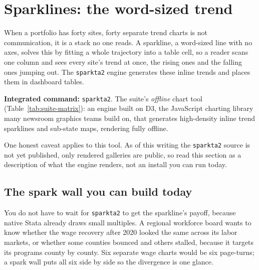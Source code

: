 \documentclass[
    a4paper,
    fontsize=10pt,
    twoside=true,
    numbers=noenddot,
]{kaobook}
\begin{document}
\section{Sparklines: the word-sized trend}
When a portfolio has forty sites, forty separate trend charts is not communication, it is a stack no one reads. A sparkline, a word-sized line with no axes, solves this by fitting a whole trajectory into a table cell, so a reader scans one column and sees every site's trend at once, the rising ones and the falling ones jumping out. The \texttt{sparkta2} engine generates these inline trends and places them in dashboard tables.

\begin{kaobox}[frametitle=Package Integration: \texttt{sparkta2}]
\textbf{Integrated command:} \texttt{sparkta2}. The suite's \emph{offline} chart tool (Table~\ref{tab:suite-matrix}): an engine built on D3, the JavaScript charting library many newsroom graphics teams build on, that generates high-density inline trend sparklines and sub-state maps, rendering fully offline.
\end{kaobox}

One honest caveat applies to this tool. As of this writing the \texttt{sparkta2} source is not yet published, only rendered galleries are public, so read this section as a description of what the engine renders, not an install you can run today.

\subsection{The spark wall you can build today}\label{sec:sparkwall}
You do not have to wait for \texttt{sparkta2} to get the sparkline's payoff, because native Stata already draws small multiples. A regional workforce board wants to know whether the wage recovery after 2020 looked the same across its labor markets, or whether some counties bounced and others stalled, because it targets its programs county by county. Six separate wage charts would be six page-turns; a spark wall puts all six side by side so the divergence is one glance.
\end{document}
